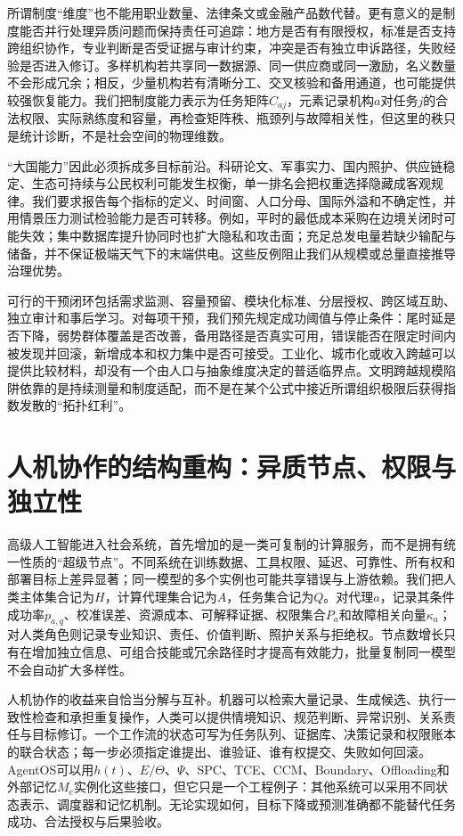 所谓制度“维度”也不能用职业数量、法律条文或金融产品数代替。更有意义的是制度能否并行处理异质问题而保持责任可追踪：地方是否有有限授权，标准是否支持跨组织协作，专业判断是否受证据与审计约束，冲突是否有独立申诉路径，失败经验是否进入修订。多样机构若共享同一数据源、同一供应商或同一激励，名义数量不会形成冗余；相反，少量机构若有清晰分工、交叉核验和备用通道，也可能提供较强恢复能力。我们把制度能力表示为任务矩阵$C_{aj}$，元素记录机构$a$对任务$j$的合法权限、实际熟练度和容量，再检查矩阵秩、瓶颈列与故障相关性，但这里的秩只是统计诊断，不是社会空间的物理维数。

“大国能力”因此必须拆成多目标前沿。科研论文、军事实力、国内照护、供应链稳定、生态可持续与公民权利可能发生权衡，单一排名会把权重选择隐藏成客观规律。我们要求报告每个指标的定义、时间窗、人口分母、国际外溢和不确定性，并用情景压力测试检验能力是否可转移。例如，平时的最低成本采购在边境关闭时可能失效；集中数据库提升协同时也扩大隐私和攻击面；充足总发电量若缺少输配与储备，并不保证极端天气下的末端供电。这些反例阻止我们从规模或总量直接推导治理优势。

可行的干预闭环包括需求监测、容量预留、模块化标准、分层授权、跨区域互助、独立审计和事后学习。对每项干预，我们预先规定成功阈值与停止条件：尾时延是否下降，弱势群体覆盖是否改善，备用路径是否真实可用，错误能否在限定时间内被发现并回滚，新增成本和权力集中是否可接受。工业化、城市化或收入跨越可以提供比较材料，却没有一个由人口与抽象维度决定的普适临界点。文明跨越规模陷阱依靠的是持续测量和制度适配，而不是在某个公式中接近所谓组织极限后获得指数发散的“拓扑红利”。

\section{人机协作的结构重构：异质节点、权限与独立性}
\label{sec:agi_topological_reconstruction}

高级人工智能进入社会系统，首先增加的是一类可复制的计算服务，而不是拥有统一性质的“超级节点”。不同系统在训练数据、工具权限、延迟、可靠性、所有权和部署目标上差异显著；同一模型的多个实例也可能共享错误与上游依赖。我们把人类主体集合记为$H$，计算代理集合记为$A$，任务集合记为$Q$。对代理$a$，记录其条件成功率$p_{a,q}$、校准误差、资源成本、可解释证据、权限集合$P_a$和故障相关向量$\kappa_a$；对人类角色则记录专业知识、责任、价值判断、照护关系与拒绝权。节点数增长只有在增加独立信息、可组合技能或冗余路径时才提高有效能力，批量复制同一模型不会自动扩大多样性。

人机协作的收益来自恰当分解与互补。机器可以检索大量记录、生成候选、执行一致性检查和承担重复操作，人类可以提供情境知识、规范判断、异常识别、关系责任与目标修订。一个工作流的状态可写为任务队列、证据库、决策记录和权限账本的联合状态；每一步必须指定谁提出、谁验证、谁有权提交、失败如何回滚。AgentOS可以用$h(t)$、$E/\Theta$、$\Psi$、SPC、TCE、CCM、Boundary、Offloading和外部记忆$M_e$实例化这些接口，但它只是一个工程例子：其他系统可以采用不同状态表示、调度器和记忆机制。无论实现如何，目标下降或预测准确都不能替代任务成功、合法授权与后果验收。

